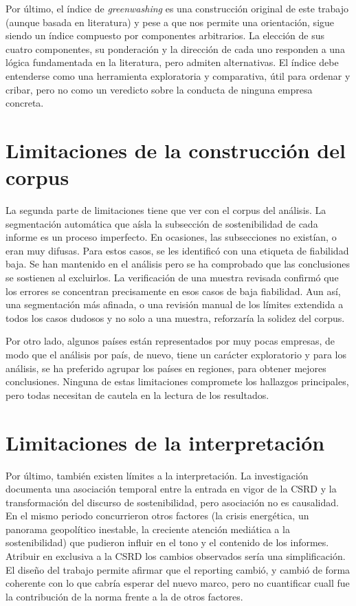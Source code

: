 Por último, el índice de \textit{greenwashing} es una construcción original de este
trabajo (aunque basada en literatura) y pese a que nos permite una orientación, sigue siendo un índice compuesto por componentes arbitrarios. 
La elección de sus cuatro componentes, su ponderación y la dirección de cada uno responden a una lógica
fundamentada en la literatura, pero admiten alternativas. El índice debe entenderse como una herramienta exploratoria y
comparativa, útil para ordenar y cribar, pero no como un veredicto sobre la conducta de ninguna
empresa concreta.

\section{Limitaciones de la construcción del corpus}
\label{sec:lim-corpus}

La segunda parte de limitaciones tiene que ver con el corpus del análisis. La
segmentación automática que aísla la subsección de sostenibilidad de cada informe es un proceso imperfecto. 
En ocasiones, las subsecciones no existían, o eran muy difusas. Para estos casos, se les identificó con una etiqueta de fiabilidad
baja. Se han mantenido en el análisis pero se ha comprobado que las conclusiones se sostienen al excluirlos. La
verificación de una muestra revisada confirmó que los errores se concentran precisamente en esos
casos de baja fiabilidad. Aun así, una segmentación más afinada, o una revisión manual de los
límites extendida a todos los casos dudosos y no solo a una muestra, reforzaría la solidez del
corpus.

Por otro lado, algunos países están
representados por muy pocas empresas, de modo que el análisis por país, de nuevo,
tiene un carácter exploratorio y para los análisis, se ha preferido agrupar los países en regiones, para obtener mejores
conclusiones. Ninguna de estas limitaciones compromete los hallazgos principales, pero
todas necesitan de cautela en la lectura de los resultados.

\section{Limitaciones de la interpretación}
\label{sec:lim-interpretacion}

Por último, también existen límites a la interpretación. La
investigación documenta una asociación temporal entre la entrada en vigor de la CSRD
y la transformación del discurso de sostenibilidad, pero asociación no es causalidad. En el
mismo periodo concurrieron otros factores (la crisis energética, un panorama geopolítico inestable, 
la creciente atención mediática a la sostenibilidad) que pudieron influir en el
tono y el contenido de los informes. Atribuir en exclusiva a la CSRD los cambios observados
sería una simplificación. El diseño del trabajo permite afirmar que el reporting
cambió, y cambió de forma coherente con lo que cabría esperar del nuevo marco, pero no cuantificar cuall fue 
la contribución de la norma frente a la de otros factores.

